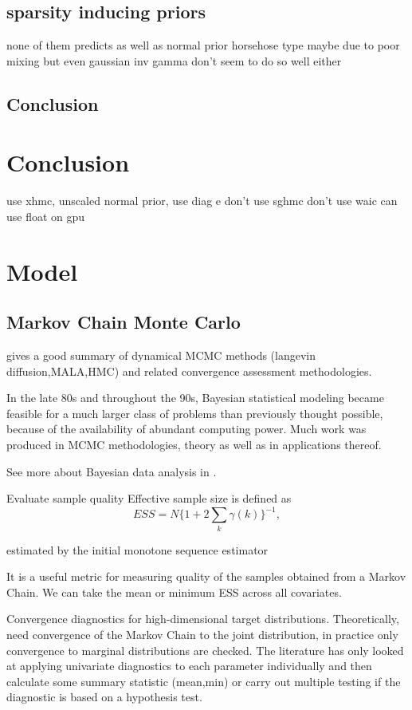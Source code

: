 \documentclass[]{report}
\begin{document}
\section{sparsity inducing priors}
none of them predicts as well as normal prior 
horsehose type maybe  due to poor mixing 
but even gaussian inv gamma don't seem to do so well either

\section{Conclusion}
\chapter{Conclusion}
use xhmc, unscaled normal prior, 
use diag e 
don't use sghmc
don't use waic 
can use float on gpu

\chapter{Model}

\section{Markov Chain Monte Carlo}




\cite{green2015bayesian} gives a good summary of dynamical MCMC methods (langevin diffusion,MALA,HMC) and related convergence assessment methodologies.

In the late 80s and throughout the 90s, Bayesian statistical modeling became
feasible for a much larger class of problems than previously thought possible,
because of the availability of abundant computing power. Much work was produced
in MCMC methodologies\cite{robert2013monte}, theory\cite{tierney1994markov,roberts2004general} as well as in applications thereof.  



See more about Bayesian data analysis in \cite{gelman2014bayesian}. 


Evaluate sample quality
Effective sample size is defined as 
\[ ESS = N \{ 1 + 2 \sum_k \gamma(k) \}^{-1}, \]

estimated by the initial
monotone sequence estimator \cite{geyer1992practical}

It is a useful metric for measuring quality of the samples obtained from a
Markov Chain. We can take the mean or minimum ESS across all covariates.

Convergence diagnostics for high-dimensional target distributions. Theoretically, need convergence of the Markov Chain to the joint distribution, in practice only convergence to marginal distributions are checked. The literature has only looked at applying univariate diagnostics to each parameter individually and then calculate some summary statistic (mean,min) or carry out multiple testing if the diagnostic is based on a hypothesis test.
\end{document}

